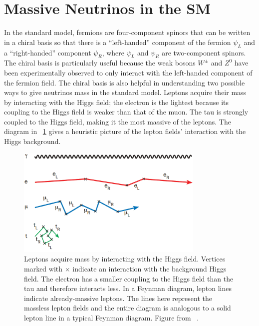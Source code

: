 \section{Massive Neutrinos in the SM}
\label{sec:mass}

In the standard model, fermions are four-component spinors that can be written in a chiral basis so that there is a ``left-handed'' component of the fermion $\psi_L$ and a ``right-handed'' component $\psi_R$, where $\psi_L$ and $\psi_R$ are two-component spinors.  The chiral basis is particularly useful because the weak bosons $W^{\pm}$ and $Z^0$ have been experimentally observed to only interact with the left-handed component of the fermion field.  The chiral basis is also helpful in understanding two possible ways to give neutrinos mass in the standard model.  Leptons acquire their mass by interacting with the Higgs field; the electron is the lightest because its coupling to the Higgs field is weaker than that of the muon.  The tau is strongly coupled to the Higgs field, making it the most massive of the leptons.  The diagram in {\fig}~\ref{fig:leptonMass} gives a heuristic picture of the lepton fields' interaction with the Higgs background.  
\begin{figure}[htp]
\centering
\includegraphics[width=0.8\textwidth]{figures/leptonMass.eps}
\caption[Lepton mass via the Higgs interaction.]{Leptons acquire mass by interacting with the Higgs field.  Vertices marked with $\times$ indicate an interaction with the background Higgs field.  The electron has a smaller coupling to the Higgs field than the tau and therefore interacts less.  In a Feynman diagram, lepton lines indicate already-massive leptons.  The lines here represent the  massless lepton fields and the entire diagram is analogous to a solid lepton line in a typical Feynman diagram.  Figure from {}~\citep{neutrinoMass}.}
\label{fig:leptonMass}
\end{figure}

